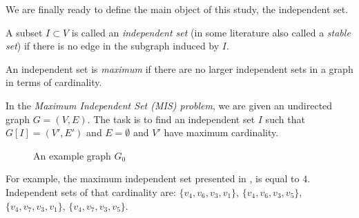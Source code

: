We are finally ready to define the main object of this study, the independent set.

\begin{defn}
A subset $I\subset V$ is called an \emph{independent set} (in some literature also called a \emph{stable set}) if there is no edge in the subgraph induced by $I$.
\end{defn}

\begin{defn}
An independent set is \emph{maximum} if there are no larger independent sets in a graph in terms of cardinality.
\end{defn}

\begin{defn}
In the \emph{Maximum Independent Set (MIS) problem}, we are given an undirected graph $G = (V,E)$. The task is to find an independent set $I$ such that $G[I]=(V',E')$ and $E=\emptyset$ and $V'$ have maximum cardinality.
\end{defn}

\begin{figure}[h]
  \centering{}
  \caption{An example graph $G_0$}
  \label{fig:mis_defn}
\end{figure}

For example, the maximum independent set presented in , is equal to $4$. Independent sets of that cardinality are: $\{v_4, v_6, v_3, v_1\}$, $\{v_4, v_6, v_3, v_5\}$, $\{v_4, v_7, v_3, v_1\}$, $\{v_4, v_7, v_3, v_5\}$.